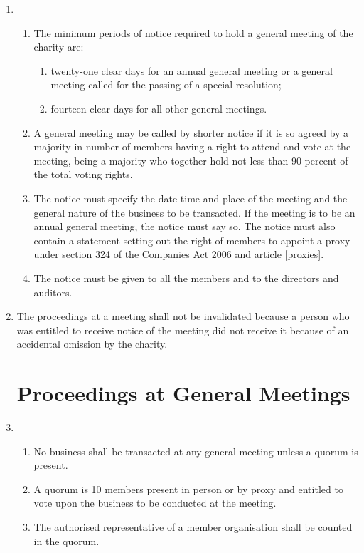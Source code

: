 \begin{enumerate}
\item
  \begin{enumerate}
  \item
    The minimum periods of notice required to hold a general meeting of
    the charity are:
    \begin{enumerate}
    \item
      twenty-one clear days for an annual general meeting or a general
      meeting called for the passing of a special resolution;
    \item
      fourteen clear days for all other general meetings.
    \end{enumerate}
  \item
    A general meeting may be called by shorter notice if it is so
    agreed by a majority in number of members having a right to attend
    and vote at the meeting, being a majority who together hold not
    less than 90 percent of the total voting rights.
  \item
    The notice must specify the date time and place of the meeting and
    the general nature of the business to be transacted. If the meeting
    is to be an annual general meeting, the notice must say so. The
    notice must also contain a statement setting out the right of
    members to appoint a proxy under section 324 of the Companies Act
    2006 and article \ref{proxies}.
  \item
    The notice must be given to all the members and to the directors
    and auditors.
  \end{enumerate}

\item
  The proceedings at a meeting shall not be invalidated because a
  person who was entitled to receive notice of the meeting did not
  receive it because of an accidental omission by the charity.

\section{Proceedings at General Meetings}

\item
  \begin{enumerate}
  \item
    No business shall be transacted at any general meeting unless a
    quorum is present.
  \item
    A quorum is 10 members present in person or by proxy and entitled to vote upon
      the business to be conducted at the meeting.
  \item
    The authorised representative of a member organisation shall be
    counted in the quorum.
  \end{enumerate}


\end{enumerate}
